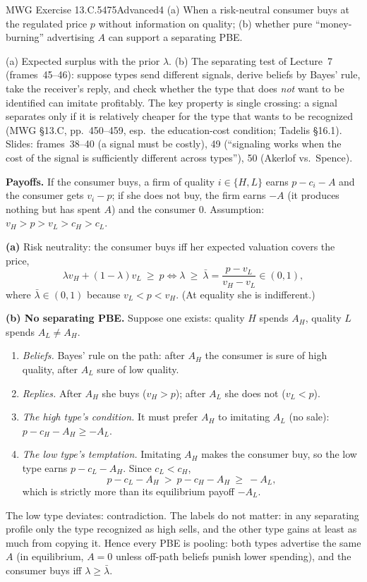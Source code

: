 \begin{exsol}{MWG Exercise 13.C.5}{475}{Advanced}{4}
\asked (a) When a risk-neutral consumer buys at the regulated price $p$ without information on quality;
(b) whether pure ``money-burning'' advertising $A$ can support a separating PBE.

\method (a) Expected surplus with the prior $\lambda$. (b) The separating test of Lecture~7 (frames~45--46):
suppose types send different signals, derive beliefs by Bayes' rule, take the receiver's reply, and check
whether the type that does \emph{not} want to be identified can imitate profitably. The key property is
single crossing: a signal separates only if it is relatively cheaper for the type that wants to be
recognized (MWG \S13.C, pp.~450--459, esp.\ the education-cost condition; Tadelis \S16.1). Slides: frames~38--40
(a signal must be costly), 49 (``signaling works when the cost of the signal is sufficiently different across
types''), 50 (Akerlof vs.\ Spence).

\solution
\textbf{Payoffs.} If the consumer buys, a firm of quality $i \in \{H, L\}$ earns $p - c_i - A$ and the consumer
gets $v_i - p$; if she does not buy, the firm earns $-A$ (it produces nothing but has spent $A$) and the consumer
$0$. Assumption: $v_H > p > v_L > c_H > c_L$.

\textbf{(a)} Risk neutrality: the consumer buys iff her expected valuation covers the price,
\[
  \lambda v_H + (1 - \lambda) v_L \ \ge\ p
  \iff \lambda \ \ge\ \bar\lambda = \frac{p - v_L}{v_H - v_L} \in (0, 1),
\]
where $\bar\lambda \in (0,1)$ because $v_L < p < v_H$. (At equality she is indifferent.)

\textbf{(b) No separating PBE.} Suppose one exists: quality $H$ spends $A_H$, quality $L$ spends $A_L \ne A_H$.
\begin{enumerate}[label=\arabic*.]
  \item \emph{Beliefs.} Bayes' rule on the path: after $A_H$ the consumer is sure of high quality, after $A_L$
  sure of low quality.
  \item \emph{Replies.} After $A_H$ she buys ($v_H > p$); after $A_L$ she does not ($v_L < p$).
  \item \emph{The high type's condition.} It must prefer $A_H$ to imitating $A_L$ (no sale):
  $p - c_H - A_H \ge -A_L$.
  \item \emph{The low type's temptation.} Imitating $A_H$ makes the consumer buy, so the low type earns
  $p - c_L - A_H$. Since $c_L < c_H$,
  \[
    p - c_L - A_H \ >\ p - c_H - A_H \ \ge\ -A_L ,
  \]
  which is strictly more than its equilibrium payoff $-A_L$.
\end{enumerate}
The low type deviates: contradiction. The labels do not matter: in any separating profile only the type
recognized as high sells, and the other type gains at least as much from copying it. Hence every PBE is
pooling: both types advertise the same $A$ (in equilibrium, $A = 0$ unless off-path beliefs punish lower
spending), and the consumer buys iff $\lambda \ge \bar\lambda$.


\end{exsol}
